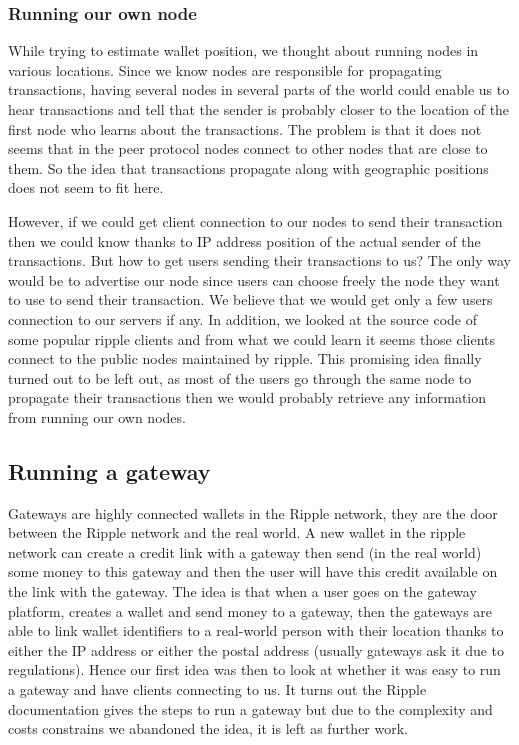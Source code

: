 \subsubsection{Running our own node}
While trying to estimate wallet position, we thought about running nodes in various locations. Since we know nodes are responsible for propagating transactions, having several nodes in several parts of the world could enable us to hear transactions and tell that the sender is probably closer to the location of the first node who learns about the transactions. The problem is that it does not seems that in the peer protocol nodes connect to other nodes that are close to them. So the idea that transactions propagate along with geographic positions does not seem to fit here.

However, if we could get client connection to our nodes to send their transaction then we could know thanks to IP address position of the actual sender of the transactions. But how to get users sending their transactions to us? The only way would be to advertise our node since users can choose freely the node they want to use to send their transaction. We believe that we would get only a few users connection to our servers if any. In addition, we looked at the source code of some popular ripple clients and from what we could learn it seems those clients connect to the public nodes maintained by ripple. This promising idea finally turned out to be left out, as most of the users go through the same node to propagate their transactions then we would probably retrieve any information from running our own nodes.

\subsection{Running a gateway}
Gateways are highly connected wallets in the Ripple network, they are the door between the Ripple network and the real world. A new wallet in the ripple network can create a credit link with a gateway then send (in the real world) some money to this gateway and then the user will have this credit available on the link with the gateway. The idea is that when a user goes on the gateway platform, creates a wallet and send money to a gateway, then the gateways are able to link wallet identifiers to a real-world person with their location thanks to either the IP address or either the postal address (usually gateways ask it due to regulations). Hence our first idea was then to look at whether it was easy to run a gateway and have clients connecting to us. It turns out the Ripple documentation\cite{runGateway} gives the steps to run a gateway but due to the complexity and costs constrains we abandoned the idea, it is left as further work.

